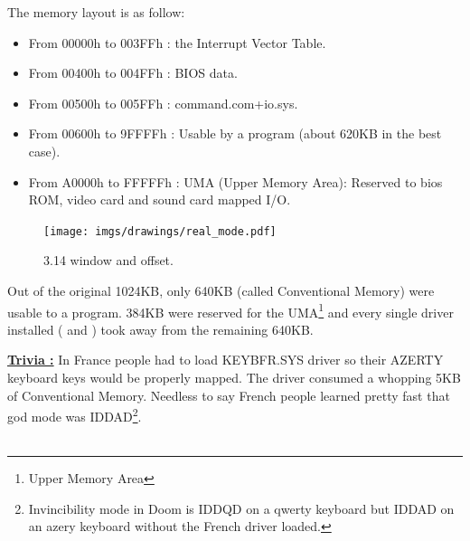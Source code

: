 \documentclass[book.tex]{subfiles}
\begin{document}
  \bigskip
The memory layout is as follow:\\
\begin{itemize}
\item From 00000h to 003FFh : the Interrupt Vector Table.
\item From 00400h to 004FFh : BIOS data.
\item From 00500h to 005FFh : command.com+io.sys.
\item From 00600h to 9FFFFh : Usable by a program (about 620KB in the best case). 
\item From A0000h to FFFFFh : UMA (Upper Memory Area): Reserved to bios ROM, video card and sound card mapped I/O.
\end{itemize}

\begin{figure}[H]
\centering
\texttt{[image: imgs/drawings/real\_mode.pdf]}

\caption{3.14 window and offset.}
\label{fig:fp_internals}
\end{figure}


Out of the original 1024KB, only 640KB (called Conventional Memory) were usable to a program. 384KB were reserved for the UMA\footnote{Upper Memory Area} and every single driver installed ( and )  took away from the remaining 640KB.

\bigskip

\textbf{\underline{Trivia :}}  In France people had to load KEYBFR.SYS driver so their AZERTY keyboard keys would be properly mapped. The driver consumed a whopping 5KB of Conventional Memory. Needless to say French people learned pretty fast that god mode was IDDAD\footnote{Invincibility mode in Doom is IDDQD on a qwerty keyboard but IDDAD on an azery keyboard without the French driver loaded.}.\\
\\
\end{document}
